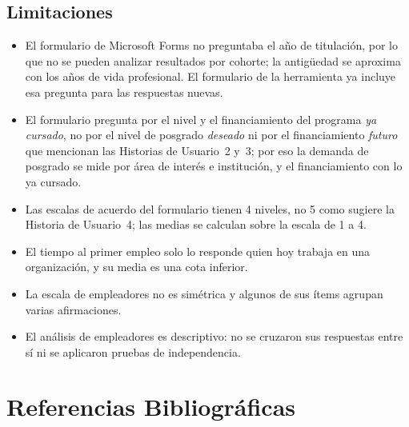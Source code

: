 \documentclass[12pt, a4paper]{article}
\begin{document}


\subsection*{Limitaciones}

\begin{itemize}
  \item El formulario de Microsoft Forms no preguntaba el año de
  titulación, por lo que no se pueden analizar resultados por cohorte; la
  antigüedad se aproxima con los años de vida profesional. El formulario
  de la herramienta ya incluye esa pregunta para las respuestas nuevas.
  \item El formulario pregunta por el nivel y el financiamiento del
  programa \emph{ya cursado}, no por el nivel de posgrado \emph{deseado} ni
  por el financiamiento \emph{futuro} que mencionan las Historias de
  Usuario~2 y~3; por eso la demanda de posgrado se mide por área de
  interés e institución, y el financiamiento con lo ya cursado.
  \item Las escalas de acuerdo del formulario tienen 4 niveles, no 5 como
  sugiere la Historia de Usuario~4; las medias se calculan sobre la escala
  de 1 a 4.
  \item El tiempo al primer empleo solo lo responde quien hoy trabaja en
  una organización, y su media es una cota inferior.
  \item La escala de empleadores no es simétrica y algunos de sus ítems
  agrupan varias afirmaciones.
  \item El análisis de empleadores es descriptivo: no se cruzaron sus
  respuestas entre sí ni se aplicaron pruebas de independencia.
\end{itemize}

\section*{Referencias Bibliográficas}
\end{document}
